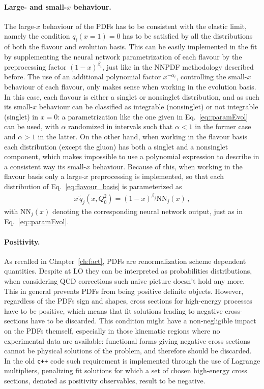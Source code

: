 \paragraph{Large- and small-$x$ behaviour.} 
The large-$x$ behaviour of the PDFs has to be consistent with the elastic limit, namely the condition
$q_i\left(x=1\right)=0$ has to be satisfied by all the distributions of both the flavour and evolution basis.
This can be easily implemented in the fit by supplementing the neural network parametrization of 
each flavour by the preprocessing factor $\left(1-x\right)^{\beta_i}$, just like in the NNPDF methodology
described before.
The use of an additional polynomial factor $x^{-\alpha_i}$, controlling the small-$x$ behaviour of each flavour,
only makes sense when working in the evolution basis. In this case, each flavour is either a singlet or nonsinglet
distribution, and as such its small-$x$ behaviour can be classified as integrable (nonsinglet) or not integrable (singlet)
in $x=0$: a parametrization like the one given in Eq.~\eqref{eq::paramEvol} can be used, with $\alpha$
randomized in intervals such that $\alpha<1$ in the former case and $\alpha>1$ in the latter.
%
On the other hand, when working in the flavour basis each distribution (except the gluon) has both a singlet 
and a nonsinglet component, which makes impossible to use a polynomial expression 
to describe in a consistent way its small-$x$ behaviour. Because of this, when working in the flavour basis
only a large-$x$ preprocessing is implemented, so that each distribution of Eq.~\eqref{eq:flavour_basis} is
parameterized as
\begin{align}
    x\,\tilde{q}_j\left(x, Q_0^2\right) = \left(1-x\right)^{\beta_{j}}\text{NN}_{j}\left(x\right)\,,
\end{align}
with $\text{NN}_{j}\left(x\right)$ denoting the corresponding neural network output, just as in Eq.~\eqref{eq::paramEvol}.



\paragraph{Positivity.}
As recalled in Chapter~\ref{ch:fact}, PDFs are renormalization scheme dependent quantities.
Despite at LO they can be interpreted as probabilities distributions, when considering QCD corrections
such naive picture doesn't hold any more. This in general prevents PDFs from being positive definite objects.
However, regardless of the PDFs sign and shapes, cross sections for high-energy processes have to be positive,
which means that fit solutions leading to negative cross-sections have to be discarded.
This condition might have a non-negligible impact on the PDFs themself, 
especially in those kinematic regions where no experimental
data are available: functional forms giving negative cross sections cannot be 
physical solutions of the problem, and therefore should be discarded.  
In the old {\tt c++} code such requirement is implemented through the use of Lagrange multipliers, 
penalizing fit solutions for which a set of chosen high-energy cross sections,
denoted as positivity observables, result to be negative.

